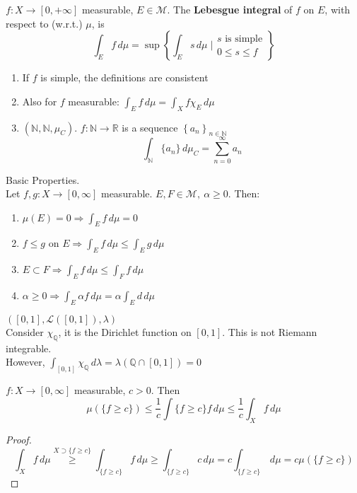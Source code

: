 \begin{definition}
    \(f:X \to [0, +\infty]\) measurable, \(E \in \mathcal{M}\). The \textbf{Lebesgue integral} of \(f\) on \(E\), with respect to (w.r.t.) \(\mu\), is 
    \[
        \int_E f \, d\mu = \sup \left\{ \int_E s \, d\mu \; \bigg\lvert \begin{array}{l}s\text{ is simple} \\ 0 \leq s \leq f \end{array}\right\}
    \]
\end{definition}

\begin{enumerate}
    \item If \(f \) is simple, the definitions are consistent
    \item Also for \(f\) measurable: \( \int_E f \, d\mu = \int_X f \chi_E \, d\mu\)
    \item \( \left( \mathbb{N}, \mathcal{\mathbb{N}}, \mu_C \right)\). \(f: \mathbb{N} \to \mathbb{R}\) is a sequence \( \left\{ a_n \right\}_{n \in \mathbb{N}}\) \[ \int_\mathbb{N} \{a_n\} \, d\mu_C = \sum_{n=0}^\infty a_n\]
\end{enumerate}

Basic Properties. \\
Let \(f, g : X \to \left[0, \infty\right]\) measurable. \(E, F \in \mathcal{M}, \ \alpha \geq 0\). Then: 
\begin{enumerate}
    \item \(\mu(E)=0 \Rightarrow \int_E f \, d\mu = 0\)
    \item \(f \leq g \) on \(E \Rightarrow \int_E f \, d\mu \leq \int_E g \, d\mu \)
    \item \(E \subset F \Rightarrow \int_E f \, d\mu \leq \int_F f \, d\mu\)
    \item \(\alpha \geq 0 \Rightarrow \int_E \alpha f \, d\mu = \alpha \int_E d \, d\mu\)
\end{enumerate}

\begin{remark}
    \(\left(\left[0, 1\right], \mathcal{L}(\left[0, 1\right]), \lambda  \right)\) \\
    Consider \(\chi_\mathbb{Q}\), it is the Dirichlet function on \(\left[0, 1\right]\). This is not Riemann integrable. \\ 
    However, \(\int_{\left[0,1\right]} \chi_{\mathbb{Q}} \, d\lambda = \lambda \left( \mathbb{Q} \cap \left[0,1\right] \right) =0 \)
\end{remark}

\begin{theorem}
    \(f: X \to \left[0, \infty \right]\) measurable, \(c > 0\). Then \[ \mu\left(\{f \geq c \}\right) \leq \frac{1}{c} \int{\{f \geq c \}} f \, d\mu \leq \frac{1}{c} \int_X f \, d\mu \]
\end{theorem}
\begin{proof}
    \[ \int_X f \, d\mu \overset{X \supset \{f \geq c\}}{\geq} \int_{\{f \geq c \}} f \, d\mu \geq \int_{\{f \geq c\}} c \, d\mu 
    = c \int_{\{f \geq c\}} \, d\mu 
    = c \mu \left(\{f \geq c\}\right) \]
\end{proof}

